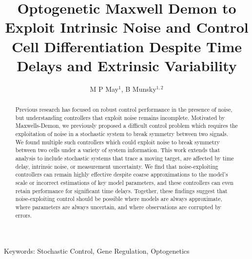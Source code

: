 \documentclass[12pt]{article}
\begin{document}
\title{Optogenetic Maxwell Demon to Exploit Intrinsic Noise and Control Cell Differentiation Despite Time Delays and Extrinsic Variability}
\maketitle

\author{M P May$^1$, B Munsky$^{1,2}$}



\begin{abstract}



Previous research has focused on robust control performance in the presence of noise, but understanding controllers that exploit noise remains incomplete. 
Motivated by Maxwells-Demon, we previously proposed a difficult control problem which requires the exploitation of noise in a stochastic system to break symmetry between two signals. We found multiple such controllers which could exploit noise to break symmetry between two cells under a variety of system information.
This work extends that analysis to include stochastic systems that trace a moving target, are affected by time delay, intrinsic noise, or measurement uncertainty.
 We find that noise-exploiting controllers can remain highly effective despite coarse approximations to the model's scale or incorrect estimations of key model parameters, and these controllers can even retain performance for significant time delays.  Together, these findings suggest that noise-exploiting control should be possible where models are always approximate, where parameters are always uncertain, and where observations are corrupted by errors.



\end{abstract}
Keywords: Stochastic Control, Gene Regulation, Optogenetics

%
%
%
\maketitle
% 
\end{document}
